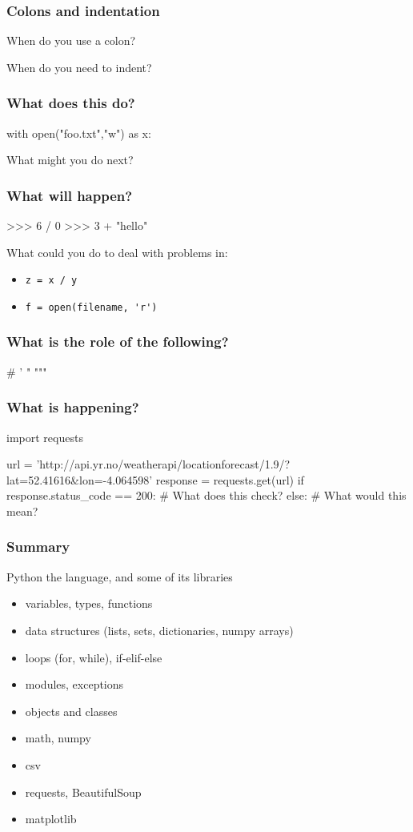 \documentclass{beamer}
\begin{document}
\begin{frame}[fragile]
\frametitle{Colons and indentation}
When do you use a colon?

When do you need to indent?
\end{frame}

\begin{frame}[fragile]
\frametitle{What does this do?}
\begin{code}
with open("foo.txt","w") as x:
\end{code}

What might you do next?
\end{frame}

\begin{frame}[fragile]
\frametitle{What will happen?}
\begin{code}
>>> 6 / 0
>>> 3 + "hello"
\end{code}

What could you do to deal with problems in:
\begin{itemize}
\item \lstinline{z = x / y}
\item \lstinline{f = open(filename, 'r')}
\end{itemize}
\end{frame}

\begin{frame}[fragile]
\frametitle{What is the role of the following?}
\begin{code}
#
'
"
"""
\end{code}
\end{frame}

\begin{frame}[fragile]
\frametitle{What is happening?}
\begin{code}
import requests

url = 'http://api.yr.no/weatherapi/locationforecast/1.9/?lat=52.41616&lon=-4.064598'
response = requests.get(url)
if response.status_code == 200:
   # What does this check?
else:
   # What would this mean?
\end{code}
\end{frame}


\begin{frame}[fragile]
\frametitle{Summary}
Python the language, and some of its libraries 
\begin{itemize}
\item variables, types, functions
\item data structures (lists, sets, dictionaries, numpy arrays)
\item loops (for, while), if-elif-else
\item modules, exceptions
\item objects and classes
\end{itemize}
\begin{itemize}
\item math, numpy
\item csv
\item requests, BeautifulSoup
\item matplotlib
\end{itemize}
\end{frame}
\end{document}
